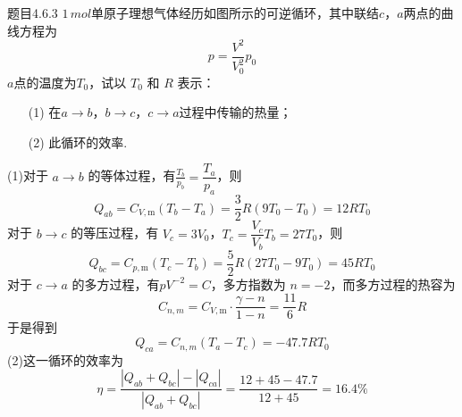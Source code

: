 \begin{question}{题目4.6.3}
    $1\,\si{mol}$单原子理想气体经历如图所示的可逆循环，其中联结$c$，$a$两点的曲线方程为
    $$
        p=\frac{V^2}{V_0^2}p_0
    $$
    $a$点的温度为$T_0$，试以 $T_0$ 和 $R$ 表示：
    \begin{enumerate}
        \item [(1)] 在$a \to b$，$b \to c$，$c \to a$过程中传输的热量；
        \item [(2)] 此循环的效率.
    \end{enumerate}
    \begin{center}
    \end{center}
\end{question}
\begin{solution}
    (1)对于 $a \to b$ 的等体过程，有$\frac{T_b}{p_b} = \dfrac{T_a}{p_a}$，则
    $$
        Q_{ab} = C_{V,\mathrm{m}}(T_b - T_a) = \frac{3}{2}R(9T_0 - T_0) = 12RT_0
    $$
    对于 $b \to c$ 的等压过程，有 $V_c = 3V_0$，$T_c = \dfrac{V_c}{V_b}T_b = 27T_0$，则
    $$
        Q_{bc} = C_{p,\mathrm{m}}(T_c - T_b) = \frac{5}{2}R(27T_0 - 9T_0) = 45RT_0
    $$
    对于 $c \to a$ 的多方过程，有$pV^{-2} = C$，多方指数为 $n=-2$，而多方过程的热容为
    $$
        C_{n,m} = C_{V,\mathrm{m}} \cdot \frac{\gamma - n}{1 - n} = \frac{11}{6}R
    $$
    于是得到
    $$
        Q_{ca} = C_{n,m}(T_a - T_c) = -47.7RT_0
    $$
    (2)这一循环的效率为
    $$
        \eta
        = \frac{|Q_{ab} + Q_{bc}| - |Q_{ca}|}{|Q_{ab} + Q_{bc}|}
        = \frac{12+45-47.7}{12+45}
        = 16.4\%
    $$
\end{solution}

